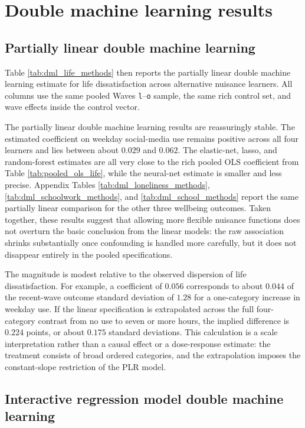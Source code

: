 \documentclass[11pt,oneside,a4paper]{book}
\newcommand{\tocsection}[2]{%
  \section[#1]{#2}%
}
\begin{document}
\tocsection{Double Machine Learning Results}{Double machine learning results}

\subsection[Partially Linear Double Machine Learning]{Partially linear double machine learning}

Table \ref{tab:dml_life_methods} then reports the partially linear double machine learning estimate for life dissatisfaction across alternative nuisance learners. All columns use the same pooled Waves \texttt{l}--\texttt{o} sample, the same rich control set, and wave effects inside the control vector.



The partially linear double machine learning results are reassuringly stable. The estimated coefficient on weekday social-media use remains positive across all four learners and lies between about \(0.029\) and \(0.062\). The elastic-net, lasso, and random-forest estimates are all very close to the rich pooled OLS coefficient from Table \ref{tab:pooled_ols_life}, while the neural-net estimate is smaller and less precise. Appendix Tables \ref{tab:dml_loneliness_methods}, \ref{tab:dml_schoolwork_methods}, and \ref{tab:dml_school_methods} report the same partially linear comparison for the other three wellbeing outcomes. Taken together, these results suggest that allowing more flexible nuisance functions does not overturn the basic conclusion from the linear models: the raw association shrinks substantially once confounding is handled more carefully, but it does not disappear entirely in the pooled specifications.

The magnitude is modest relative to the observed dispersion of life dissatisfaction. For example, a coefficient of \(0.056\) corresponds to about \(0.044\) of the recent-wave outcome standard deviation of \(1.28\) for a one-category increase in weekday use. If the linear specification is extrapolated across the full four-category contrast from no use to seven or more hours, the implied difference is \(0.224\) points, or about \(0.175\) standard deviations. This calculation is a scale interpretation rather than a causal effect or a dose-response estimate: the treatment consists of broad ordered categories, and the extrapolation imposes the constant-slope restriction of the PLR model.

\subsection[Interactive Regression Model Double Machine Learning]{Interactive regression model double machine learning}
\end{document}
